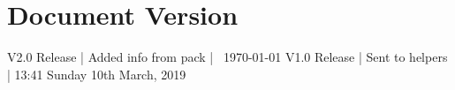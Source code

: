 \documentclass[a4paper]{article}
\begin{document}
\section*{Document Version}
V2.0 Release | Added info from pack | \currenttime \ \today \newline
V1.0 Release | Sent to helpers | 13:41 Sunday 10th March, 2019
\end{document}
